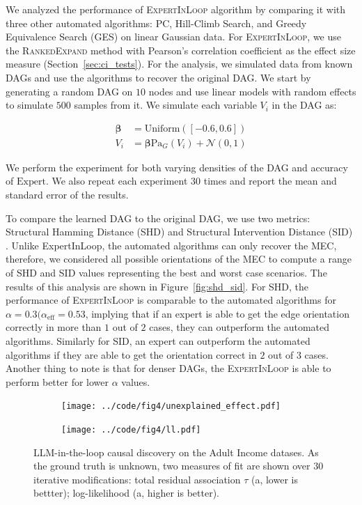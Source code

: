 \documentclass{uai2025} %
\begin{document}
We analyzed the performance of \textsc{ExpertInLoop} algorithm by comparing it
with three other automated algorithms: PC, Hill-Climb Search, and Greedy
Equivalence Search (GES) on linear Gaussian data. For \textsc{ExpertInLoop}, we
use the \textsc{RankedExpand} method with Pearson's correlation coefficient as
the effect size measure (Section~\ref{sec:ci_tests}). For the analysis, we
simulated data from known DAGs and use the algorithms to recover the original
DAG. We start by generating a random DAG on $10$ nodes and use linear models
with random effects to simulate $ 500 $ samples from it. We simulate each
variable $ V_i $ in the DAG as:


\begin{equation}
	\begin{split}
		\bm{\beta} &= \mathrm{Uniform}([-0.6, 0.6]) \\
		V_i &= \bm{\beta} \mathrm{Pa}_G(V_i) + \mathcal{N}(0, 1)
	\end{split}
\end{equation}

We perform the experiment for both varying densities of the DAG and accuracy of
$\mathrm{Expert}$. We also repeat each experiment $ 30 $ times and report the
mean and standard error of the results.

To compare the learned DAG to the original DAG, we use two metrics: Structural
Hamming Distance (SHD) and Structural Intervention Distance (SID)
\citep{Peters2015}. Unlike \textrm{ExpertInLoop}, the automated algorithms can
only recover the MEC, therefore, we considered all possible orientations of the
MEC to compute a range of SHD and SID values representing the best and worst
case scenarios. The results of this analysis are shown in
Figure~\ref{fig:shd_sid}. For SHD, the performance of \textsc{ExpertInLoop} is
comparable to the automated algorithms for $ \alpha = 0.3
(\alpha_{\textrm{eff}} = 0.53 $, implying that if an expert is able to get the
edge orientation correctly in more than $ 1 $ out of $ 2 $ cases, they can
outperform the automated algorithms. Similarly for SID, an expert can outperform 
the automated algorithms if they are able to get the orientation correct in $ 2 $ 
out of $ 3 $ cases. Another thing to note is that for denser DAGs, the 
\textsc{ExpertInLoop} is able to perform better for lower $ \alpha $ values.

\begin{figure}[t!]
	\begin{subfigure}{0.25\textwidth}
		\centering
		\texttt{[image: ../code/fig4/unexplained\_effect.pdf]}
		\caption{}
	\end{subfigure}%
	\begin{subfigure}{0.25\textwidth}
		\centering
		\texttt{[image: ../code/fig4/ll.pdf]}
		\caption{}
	\end{subfigure}
	\caption{LLM-in-the-loop causal discovery on the Adult Income datases. As the ground 
truth is unknown, two measures of fit are shown over 30 iterative modifications: 
total residual association $\tau$ (a, lower is bettter); log-likelihood (a, higher is better).
	}
	\label{fig:unexplained_ll}
\end{figure}
\end{document}
